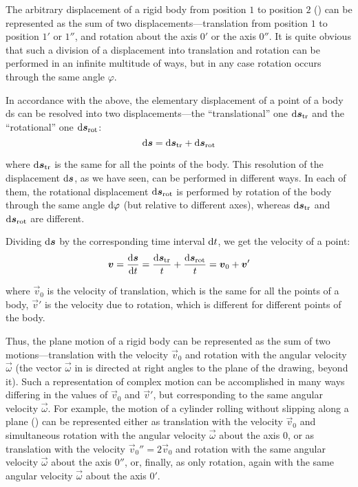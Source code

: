 The arbitrary displacement of a rigid body from position $1$ to position $2$ () can be represented as the sum of two displacements---translation from position $1$ to position $1'$ or $1''$, and rotation about the axis $0'$ or the axis $0''$. It is quite obvious that such a division of a displacement into translation and rotation can be performed in an infinite multitude of ways, but in any case rotation occurs through the same angle $\varphi$.

In accordance with the above, the elementary displacement of a point of a body ds can be resolved into two displacements---the ``translational'' one $\mathrm{d}\boldsymbol{s}_{\text{tr}}$ and the ``rotational'' one $\mathrm{d}\boldsymbol{s}_{\text{rot}}$:
\begin{equation*}
\mathrm{d}\boldsymbol{s} = \mathrm{d}\boldsymbol{s}_{\text{tr}} + \mathrm{d}\boldsymbol{s}_{\text{rot}}
\end{equation*}

\noindent
where $\mathrm{d}\boldsymbol{s}_{\text{tr}}$ is the same for all the points of the body. This resolution of the displacement $\mathrm{d}\boldsymbol{s}$, as we have seen, can be performed in different ways. In each of them, the rotational displacement $\mathrm{d}\boldsymbol{s}_{\text{rot}}$ is performed by rotation of the body through the same angle $\mathrm{d}\varphi$ (but relative to different axes), whereas $\mathrm{d}\boldsymbol{s}_{\text{tr}}$ and $\mathrm{d}\boldsymbol{s}_{\text{rot}}$ are different.

Dividing $\mathrm{d}\boldsymbol{s}$ by the corresponding time interval $\mathrm{d} t$, we get the velocity of a point:
\begin{equation*}
\boldsymbol{v} = \frac{\mathrm{d}\boldsymbol{s}}{\mathrm{d} t} = \frac{\mathrm{d}\boldsymbol{s}_{\text{tr}}}{t} + \frac{\mathrm{d}\boldsymbol{s}_{\text{rot}}}{t} = \boldsymbol{v}_0 + \boldsymbol{v}'
\end{equation*}

\noindent
where $\vec{v}_0$ is the velocity of translation, which is the same for all the points of a body, $\vec{v}'$ is the velocity due to rotation, which is different for different points of the body.

Thus, the plane motion of a rigid body can be represented as the sum of two motions---translation with the velocity $\vec{v}_0$ and rotation with the angular velocity $\vec{\omega}$ (the vector $\vec{\omega}$ in  is directed at right angles to the plane of the drawing, beyond it). Such a representation of complex motion can be accomplished in many ways differing in the values of $\vec{v}_0$ and $\vec{v}'$, but corresponding to the same angular velocity $\vec{\omega}$. For example, the motion of a cylinder rolling without slipping along a plane () can be represented either as translation with the velocity $\vec{v}_0$ and simultaneous rotation with the angular velocity $\vec{\omega}$ about the axis $0$, or as translation with the velocity $\vec{v}_0''=2\vec{v}_0$ and rotation with the same angular velocity $\vec{\omega}$ about the axis $0''$, or, finally, as only rotation, again with the same angular velocity $\vec{\omega}$ about the axis $0'$.

